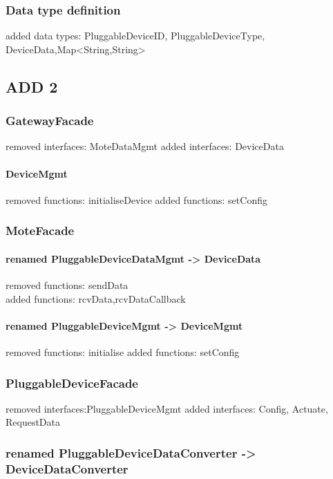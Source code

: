 \documentclass[english]{sareport}
\begin{document}
        \subsubsection{Data type definition}
            added data types: PluggableDeviceID, PluggableDeviceType, DeviceData,Map<String,String>

    \subsection{ADD 2}
        \subsubsection{GatewayFacade}
            removed interfaces: MoteDataMgmt
            added interfaces: DeviceData
            \paragraph {DeviceMgmt}
            removed functions: initialiseDevice
            added functions: setConfig
     
        \subsubsection{MoteFacade}
            \paragraph{renamed PluggableDeviceDataMgmt -> DeviceData}
            removed functions: sendData\\
            added functions: rcvData,rcvDataCallback
            \paragraph{renamed PluggableDeviceMgmt -> DeviceMgmt}
            removed functions: initialise 
            added functions: setConfig
        \subsubsection{PluggableDeviceFacade}
            removed interfaces:PluggableDeviceMgmt 
            added interfaces: Config, Actuate, RequestData
        
        \subsubsection{renamed PluggableDeviceDataConverter -> DeviceDataConverter}
\end{document}
